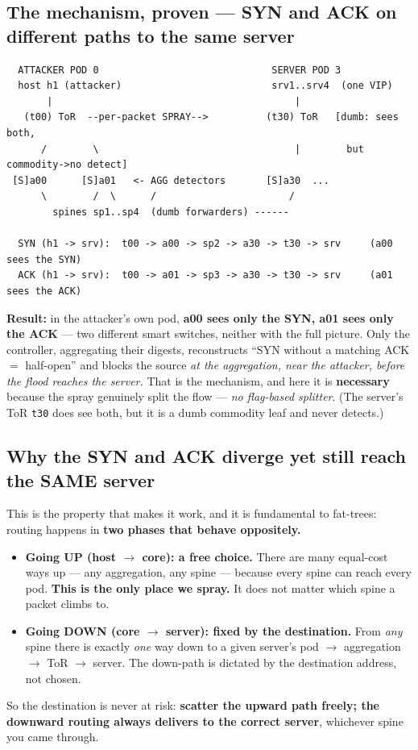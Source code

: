 \documentclass[11pt]{article}
\begin{document}
\subsection*{The mechanism, proven --- SYN and ACK on different paths to the same server}
\begin{verbatim}
  ATTACKER POD 0                              SERVER POD 3
  host h1 (attacker)                          srv1..srv4  (one VIP)
       |                                          |
   (t00) ToR  --per-packet SPRAY-->          (t30) ToR   [dumb: sees both,
      /        \                                  |        but commodity->no detect]
 [S]a00      [S]a01   <- AGG detectors       [S]a30  ...
      \        /  \      /                       /
        spines sp1..sp4  (dumb forwarders) ------

  SYN (h1 -> srv):  t00 -> a00 -> sp2 -> a30 -> t30 -> srv     (a00 sees the SYN)
  ACK (h1 -> srv):  t00 -> a01 -> sp3 -> a30 -> t30 -> srv     (a01 sees the ACK)
\end{verbatim}
\textbf{Result:} in the attacker's own pod, \textbf{a00 sees only the SYN, a01 sees only the ACK} --- two
different smart switches, neither with the full picture. Only the controller, aggregating their digests,
reconstructs ``SYN without a matching ACK $=$ half-open'' and blocks the source \emph{at the aggregation,
near the attacker, before the flood reaches the server.} That is the mechanism, and here it is
\textbf{necessary} because the spray genuinely split the flow --- \emph{no flag-based splitter}. (The
server's ToR \texttt{t30} does see both, but it is a dumb commodity leaf and never detects.)

\subsection*{Why the SYN and ACK diverge yet still reach the SAME server}
This is the property that makes it work, and it is fundamental to fat-trees: routing happens in
\textbf{two phases that behave oppositely.}
\begin{itemize}[leftmargin=1.4em]
  \item \textbf{Going UP (host $\to$ core): a free choice.} There are many equal-cost ways up --- any
  aggregation, any spine --- because every spine can reach every pod. \textbf{This is the only place we
  spray.} It does not matter which spine a packet climbs to.
  \item \textbf{Going DOWN (core $\to$ server): fixed by the destination.} From \emph{any} spine there is
  exactly \emph{one} way down to a given server's pod $\to$ aggregation $\to$ ToR $\to$ server. The
  down-path is dictated by the destination address, not chosen.
\end{itemize}
So the destination is never at risk: \textbf{scatter the upward path freely; the downward routing always
delivers to the correct server}, whichever spine you came through.
\end{document}

